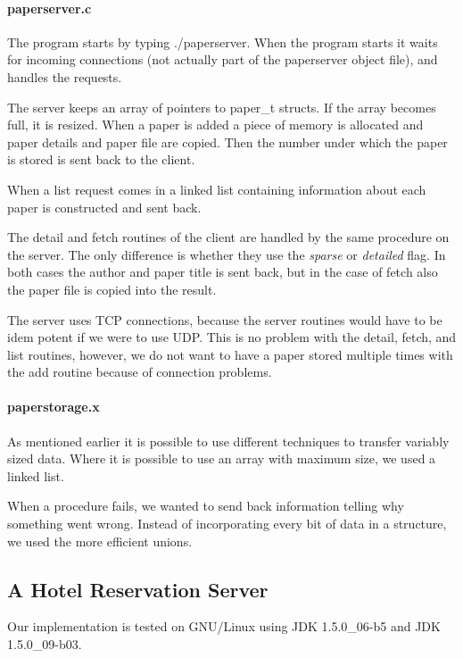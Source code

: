 \documentclass[a4paper,10pt]{article}
\begin{document}
\paragraph{paperserver.c}
The program starts by typing ./paperserver. When the program starts it waits for incoming connections (not actually part of the paperserver object file), and handles the requests.

The server keeps an array of pointers to paper\_t structs. If the array becomes full, it is resized. When a paper is added a piece of memory is allocated and paper details and paper file are copied. Then the number under which the paper is stored is sent back to the client.

When a list request comes in a linked list containing information about each paper is constructed and sent back.

The detail and fetch routines of the client are handled by the same procedure on the server. The only difference is whether they use the \emph{sparse} or \emph{detailed} flag. In both cases the author and paper title is sent back, but in the case of fetch also the paper file is copied into the result.

The server uses TCP connections, because the server routines would have to be idem potent if we were to use UDP. This is no problem with the detail, fetch, and list routines, however, we do not want to have a paper stored multiple times with the add routine because of connection problems. 

\paragraph{paperstorage.x}
As mentioned earlier it is possible to use different techniques to transfer variably sized data. Where it is possible to use an array with maximum size, we used a linked list.

When a procedure fails, we wanted to send back information telling why something went wrong. Instead of incorporating every bit of data in a structure, we used the more efficient unions.

\subsection{A Hotel Reservation Server}
Our implementation is tested on GNU/Linux using JDK 1.5.0\_06-b5 and JDK 1.5.0\_09-b03.
\end{document}
